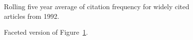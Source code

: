 \documentclass[
  10pt,
  letterpaper,
  DIV=11,
  numbers=noendperiod,
  twoside]{scrartcl}
\begin{document}
\begin{figure}


\caption{\label{fig-citation-spaghetti-1992}Rolling five year average of
citation frequency for widely cited articles from 1992.}

\end{figure}%

\begin{figure}


\caption{\label{fig-citation-facet-1992}Faceted version of
Figure~\ref{fig-citation-spaghetti-1992}.}

\end{figure}%
\end{document}
